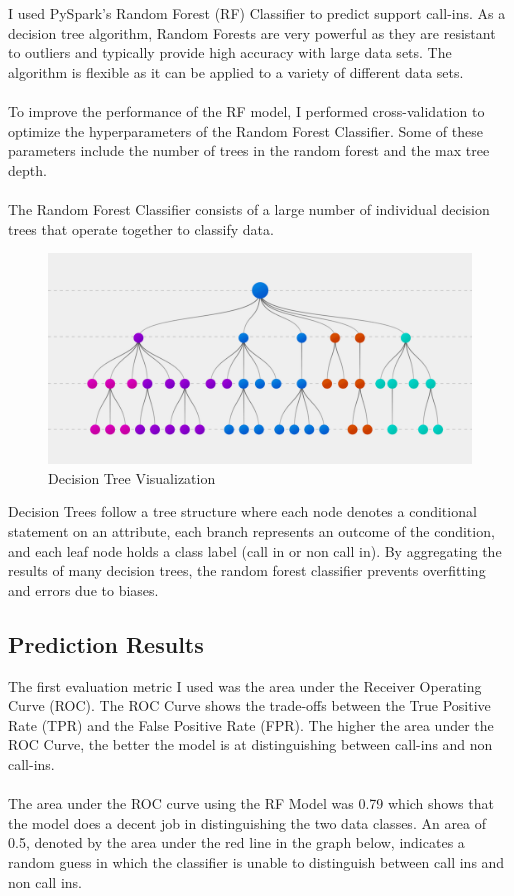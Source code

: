 \documentclass{article}
\begin{document}
I used PySpark's Random Forest (RF) Classifier to predict support call-ins. As a decision tree algorithm, Random Forests are very powerful as they are resistant to outliers and typically provide high accuracy with large data sets. The algorithm is flexible as it can be applied to a variety of different data sets. 
\\ \\
To improve the performance of the RF model, I performed cross-validation to optimize the hyperparameters of the Random Forest Classifier. Some of these parameters include the number of trees in the random forest and the max tree depth.
\\ \\ 
The Random Forest Classifier consists of a large number of individual decision trees that operate together to classify data.  

\begin{figure}[htp]
    \centering
    \includegraphics[width=12cm]{visuals/Decision-Trees-2.png}
    \caption{Decision Tree Visualization}
\end{figure}

\noindent
Decision Trees follow a tree structure where each node denotes a conditional statement on an attribute, each branch represents an outcome of the condition, and each leaf node holds a class label (call in or non call in). By aggregating the results of many decision trees, the random forest classifier prevents overfitting and errors due to biases.

\newpage
\subsection{Prediction Results}

The first evaluation metric I used was the area under the Receiver Operating Curve (ROC). The ROC Curve shows the trade-offs between the True Positive Rate (TPR) and the False Positive Rate (FPR). The higher the area under the ROC Curve, the better the model is at distinguishing between call-ins and non call-ins.
\\ \\
The area under the ROC curve using the RF Model was 0.79 which shows that the model does a decent job in distinguishing the two data classes. An area of 0.5, denoted by the area under the red line in the graph below, indicates a random guess in which the classifier is unable to distinguish between call ins and non call ins. 
\end{document}
